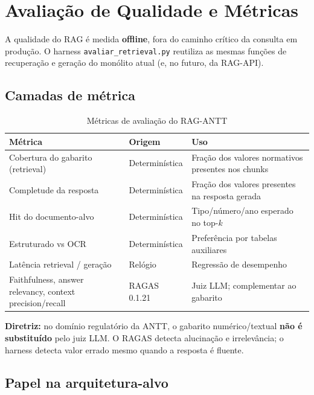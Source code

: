 \documentclass[12pt, a4paper]{article}
\begin{document}
\section{Avaliação de Qualidade e Métricas}

A qualidade do RAG é medida \textbf{offline}, fora do caminho crítico da consulta em produção. O harness \texttt{avaliar\_retrieval.py} reutiliza as mesmas funções de recuperação e geração do monólito atual (e, no futuro, da RAG-API).

\subsection{Camadas de métrica}

\begin{table}[H]
\centering
\small
\caption{Métricas de avaliação do RAG-ANTT}
\label{tab:metricas-avaliacao}
\begin{tabularx}{\textwidth}{l l X}
\toprule
\textbf{Métrica} & \textbf{Origem} & \textbf{Uso} \\
\midrule
Cobertura do gabarito (retrieval) & Determinística & Fração dos valores normativos presentes nos chunks \\
Completude da resposta & Determinística & Fração dos valores presentes na resposta gerada \\
Hit do documento-alvo & Determinística & Tipo/número/ano esperado no top-$k$ \\
Estruturado vs OCR & Determinística & Preferência por tabelas auxiliares \\
Latência retrieval / geração & Relógio & Regressão de desempenho \\
Faithfulness, answer relevancy, context precision/recall & RAGAS 0.1.21 & Juiz LLM; complementar ao gabarito \\
\bottomrule
\end{tabularx}
\end{table}

\noindent\textbf{Diretriz:} no domínio regulatório da ANTT, o gabarito numérico/textual \textbf{não é substituído} pelo juiz LLM. O RAGAS detecta alucinação e irrelevância; o harness detecta valor errado mesmo quando a resposta é fluente.

\subsection{Papel na arquitetura-alvo}
\end{document}
